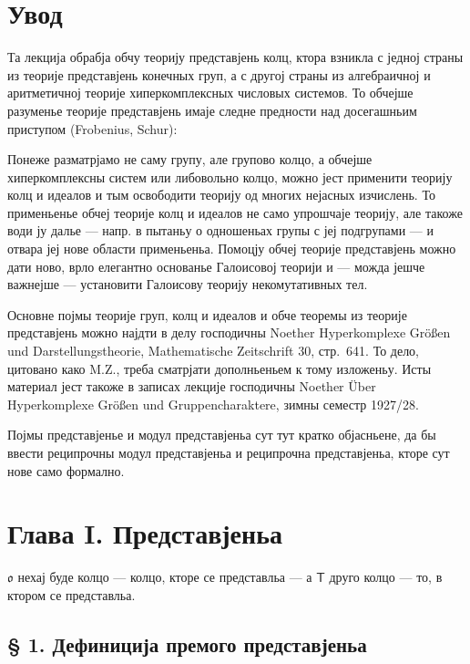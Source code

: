 \documentclass[11pt]{article}
\newcommand{\foreign}[1]{#1}
\begin{document}
\clearpage
\section*{Увод}\label{einleitung}

Та лекција обрабја обчу теорију представјень колц, ктора взникла с
једној страны из теорије представјень конечных груп, а с другој страны
из алгебраичној и аритметичној теорије хиперкомплексных числовых
системов. То обчејше разуменье теорије представјень имаје следне
предности над досегашньим приступом (\foreign{Frobenius},
\foreign{Schur}):

Понеже разматрјамо не саму групу, але групово колцо, а обчејше
хиперкомплексны систем или либовольно колцо, можно јест применити
теорију колц и идеалов и тым освободити теорију од многих нејасных
изчислень. То применьенье обчеј теорије колц и идеалов не само
упрошчаје теорију, але такоже води ју далье --- напр. в пытаньу о
одношеньах групы с јеј подгрупами --- и отвара јеј нове области
применьеньа. Помоцју обчеј теорије представјень можно дати ново, врло
елегантно основанье Галоисовој теорији и --- можда јешче важнејше ---
установити Галоисову теорију некомутативных тел.

Основне појмы теорије груп, колц и идеалов и обче теоремы из теорије
представјень можно најдти в делу господичны \foreign{Noether}
\foreign{Hyperkomplexe Größen und Darstellungstheorie},
\foreign{Mathematische Zeitschrift} 30, стр.~641. То дело, цитовано
како \foreign{M.Z.}, треба сматрјати дополньеньем к тому изложеньу.
Исты материал јест такоже в записах лекције господичны
\foreign{Noether} \foreign{Über Hyperkomplexe Größen und
Gruppencharaktere}, зимны семестр 1927/28.

Појмы представјенье и модул представјеньа сут тут кратко објасньене,
да бы ввести реципрочны модул представјеньа и реципрочна
представјеньа, кторе сут нове само формално.

\section*{Глава I. Представјеньа}\label{kapitel-i.-darstellungen}

$\mathfrak{o}$ нехај буде колцо --- колцо, кторе се представльа --- а
$\mathsf T$ друго колцо --- то, в ктором се представльа.

\subsection*{§ 1. Дефиниција премого представјеньа}\label{definition-der-direkten-darstellung}
\end{document}
